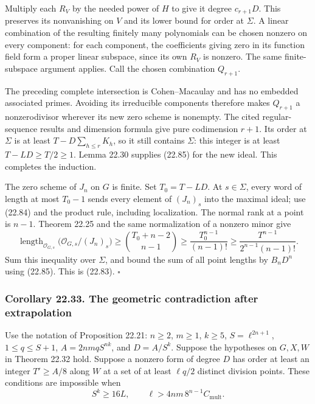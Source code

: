 \documentclass[
  11pt,
  a4paper,
]{article}
\newcounter{none} %
\begin{document}
Multiply each \(R_V\) by the needed power of \(H\) to give it degree
\(c_{r+1}D\). This preserves its nonvanishing on \(V\) and its lower
bound for order at \(\Sigma\). A linear combination of the resulting
finitely many polynomials can be chosen nonzero on every component: for
each component, the coefficients giving zero in its function field form
a proper linear subspace, since its own \(R_V\) is nonzero. The same
finite-subspace argument applies. Call the chosen combination
\(Q_{r+1}\).

The preceding complete intersection is Cohen--Macaulay and has no
embedded associated primes. Avoiding its irreducible components
therefore makes \(Q_{r+1}\) a nonzerodivisor wherever its new zero
scheme is nonempty. The cited regular-sequence results and dimension
formula give pure codimension \(r+1\). Its order at \(\Sigma\) is at
least \(T-D\sum_{h\le r}K_h\), so it still contains \(\Sigma\): this
integer is at least \(T-LD\ge T/2\ge1\). Lemma 22.30 supplies (22.85)
for the new ideal. This completes the induction.

The zero scheme of \(J_n\) on \(G\) is finite. Set \(T_0=T-LD\). At
\(s\in\Sigma\), every word of length at most \(T_0-1\) sends every
element of \((J_n)_s\) into the maximal ideal; use (22.84) and the
product rule, including localization. The normal rank at a point is
\(n-1\). Theorem 22.25 and the same normalization of a nonzero minor
give \[
 \operatorname{length}_{\mathcal O_{G,s}}
            \bigl(\mathcal O_{G,s}/(J_n)_s\bigr)
 \ge\binom{T_0+n-2}{n-1}
 \ge\frac{T_0^{n-1}}{(n-1)!}
 \ge\frac{T^{n-1}}{2^{n-1}(n-1)!}.
 \tag{22.87}
\] Sum this inequality over \(\Sigma\), and bound the sum of all point
lengths by \(B_nD^n\) using (22.85). This is (22.83). \(\square\)

\subsubsection{Corollary 22.33. The geometric contradiction after
extrapolation}\label{corollary-22.33.-the-geometric-contradiction-after-extrapolation}

Use the notation of Proposition 22.21: \(n\ge2\), \(m\ge1\), \(k\ge5\),
\(S=\ell^{2n+1}\), \(1\le q\le S+1\), \(A=2nmqS^{nk}\), and \(D=A/S^k\).
Suppose the hypotheses on \(G,X,W\) in Theorem 22.32 hold. Suppose a
nonzero form of degree \(D\) has order at least an integer \(T'\ge A/8\)
along \(W\) at a set of at least \(\ell q/2\) distinct division points.
These conditions are impossible when \[
 S^k\ge16L,
 \qquad
 \ell>4nm\,8^{n-1}C_{\mathrm{mult}}.
 \tag{22.88}
\]
\end{document}
